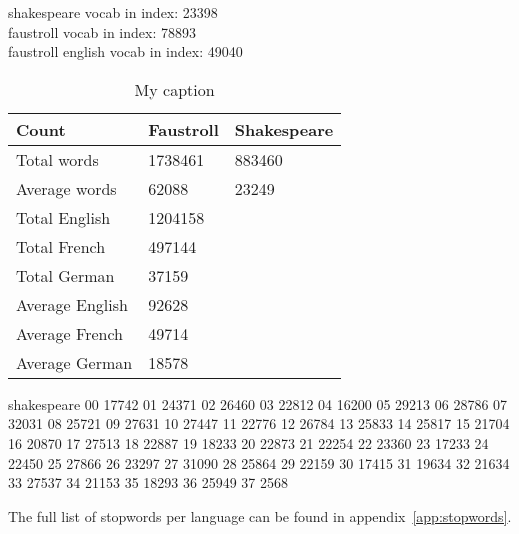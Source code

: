 {shakespeare vocab in index: 23398\\
faustroll vocab in index: 78893\\
faustroll english vocab in index: 49040

\begin{table}[]
\centering
\caption{My caption}
\label{my-label}
\begin{tabular}{lll}
\hline
Count           & Faustroll & Shakespeare \\ \hline
Total words     & 1738461   & 883460      \\
Average words   & 62088     & 23249       \\
Total English   & 1204158   &             \\
Total French    & 497144    &             \\
Total German    & 37159     &             \\
Average English & 92628     &             \\
Average French  & 49714     &             \\
Average German  & 18578     &             \\ \hline
\end{tabular}
\end{table}

shakespeare
00 17742
01 24371
02 26460
03 22812
04 16200
05 29213
06 28786
07 32031
08 25721
09 27631
10 27447
11 22776
12 26784
13 25833
14 25817
15 21704
16 20870
17 27513
18 22887
19 18233
20 22873
21 22254
22 23360
23 17233
24 22450
25 27866
26 23297
27 31090
28 25864
29 22159
30 17415
31 19634
32 21634
33 27537
34 21153
35 18293
36 25949
37 2568

The full list of stopwords per language can be found in appendix~\ref{app:stopwords}.

}
